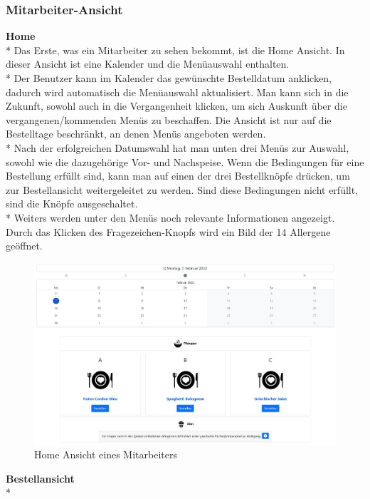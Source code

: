 \subsubsection {Mitarbeiter-Ansicht}

\textbf{Home} \\*
Das Erste, was ein Mitarbeiter zu sehen bekommt, ist die Home Ansicht. In dieser Ansicht ist eine Kalender und die Menüauswahl enthalten. \\*
Der Benutzer kann im Kalender das gewünschte Bestelldatum anklicken, dadurch wird automatisch die Menüauswahl aktualisiert. Man kann sich in die Zukunft, sowohl auch 
in die Vergangenheit klicken, um sich Auskunft über die vergangenen/kommenden Menüs zu beschaffen. Die Ansicht ist nur auf die Bestelltage beschränkt, an denen Menüs angeboten werden.\\*
Nach der erfolgreichen Datumswahl hat man unten drei Menüs zur Auswahl, sowohl wie die dazugehörige Vor- und Nachspeise. Wenn die Bedingungen für eine Bestellung erfüllt sind,
kann man auf einen der drei Bestellknöpfe drücken, um zur Bestellansicht weitergeleitet zu werden. Sind diese Bedingungen nicht erfüllt, sind die Knöpfe ausgeschaltet. \\*
Weiters werden unter den Menüs noch relevante Informationen angezeigt. Durch das Klicken des Fragezeichen-Knopfs wird ein Bild der 14 Allergene geöffnet.

\begin{figure}[htp]
    \centering
    \includegraphics[scale=0.35]{pics/mitarbeiter-home.JPG}
    \caption{Home Ansicht eines Mitarbeiters}
    \label{fig:impl:HomeMitarbeiter}
\end{figure}

\pagebreak

\textbf{Bestellansicht} \\*

